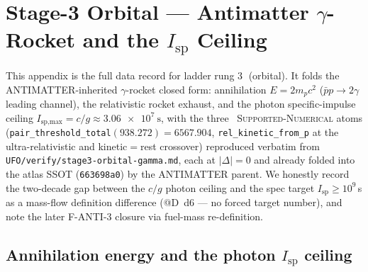 \section{Stage-3 Orbital --- Antimatter $\gamma$-Rocket and the $I_{\text{sp}}$ Ceiling}
\label{app:stage3}

This appendix is the full data record for ladder rung
\textcircled{\scriptsize 3} (orbital). It folds the
ANTIMATTER-inherited $\gamma$-rocket closed form: annihilation
$E=2m_pc^2$ ($\bar p p\!\to\!2\gamma$ leading channel), the relativistic
rocket exhaust, and the photon specific-impulse ceiling
$I_{\text{sp,max}}=c/g\approx\SI{3.06e7}{\second}$, with the three
\tierGreen\ \textsc{Supported-Numerical} atoms
(\verb|pair_threshold_total|$(938.272)=6567.904$,
\verb|rel_kinetic_from_p| at the ultra-relativistic and kinetic$=$rest
crossover) reproduced verbatim from
\texttt{UFO/verify/stage3-orbital-gamma.md}, each at $|\Delta|=0$ and
already folded into the atlas SSOT (\texttt{663698a0}) by the ANTIMATTER
parent. We honestly record the two-decade gap between the $c/g$ photon
ceiling and the spec target $I_{\text{sp}}\!\ge\!10^9$\,s as a mass-flow
definition difference (@D~d6 --- no forced target number), and note the
later F-ANTI-3 closure via fuel-mass re-definition.

\subsection{Annihilation energy and the photon $I_{\text{sp}}$ ceiling}
\label{app:stage3-deriv}


